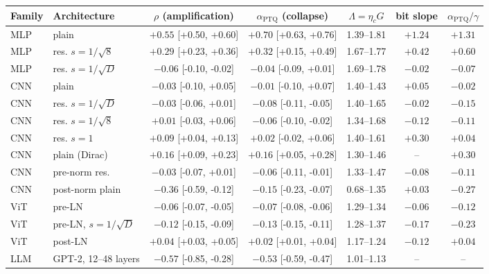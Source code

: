 \begin{tabular}{llccccc}
\toprule
Family & Architecture & $\rho$ (amplification) & $\alpha_{\mathrm{PTQ}}$ (collapse) & $\Lambda=\eta_c G$ & bit slope & $\alpha_{\mathrm{PTQ}}/\gamma$ \\
\midrule
MLP & plain & $+0.55$ {\scriptsize[+0.50, +0.60]} & $+0.70$ {\scriptsize[+0.63, +0.76]} & 1.39--1.81 & $+1.24$ & $+1.31$ \\
MLP & res. $s=1/\sqrt{8}$ & $+0.29$ {\scriptsize[+0.23, +0.36]} & $+0.32$ {\scriptsize[+0.15, +0.49]} & 1.67--1.77 & $+0.42$ & $+0.60$ \\
MLP & res. $s=1/\sqrt{D}$ & $-0.06$ {\scriptsize[-0.10, -0.02]} & $-0.04$ {\scriptsize[-0.09, +0.01]} & 1.69--1.78 & $-0.02$ & $-0.07$ \\
CNN & plain & $-0.03$ {\scriptsize[-0.10, +0.05]} & $-0.01$ {\scriptsize[-0.10, +0.07]} & 1.40--1.43 & $+0.05$ & $-0.02$ \\
CNN & res. $s=1/\sqrt{D}$ & $-0.03$ {\scriptsize[-0.06, +0.01]} & $-0.08$ {\scriptsize[-0.11, -0.05]} & 1.40--1.65 & $-0.02$ & $-0.15$ \\
CNN & res. $s=1/\sqrt{8}$ & $+0.01$ {\scriptsize[-0.03, +0.06]} & $-0.06$ {\scriptsize[-0.10, -0.02]} & 1.34--1.68 & $-0.12$ & $-0.11$ \\
CNN & res. $s=1$ & $+0.09$ {\scriptsize[+0.04, +0.13]} & $+0.02$ {\scriptsize[-0.02, +0.06]} & 1.40--1.61 & $+0.30$ & $+0.04$ \\
CNN & plain (Dirac) & $+0.16$ {\scriptsize[+0.09, +0.23]} & $+0.16$ {\scriptsize[+0.05, +0.28]} & 1.30--1.46 & -- & $+0.30$ \\
CNN & pre-norm res. & $-0.03$ {\scriptsize[-0.07, +0.01]} & $-0.06$ {\scriptsize[-0.11, -0.01]} & 1.33--1.47 & $-0.08$ & $-0.11$ \\
CNN & post-norm plain & $-0.36$ {\scriptsize[-0.59, -0.12]} & $-0.15$ {\scriptsize[-0.23, -0.07]} & 0.68--1.35 & $+0.03$ & $-0.27$ \\
ViT & pre-LN & $-0.06$ {\scriptsize[-0.07, -0.05]} & $-0.07$ {\scriptsize[-0.08, -0.06]} & 1.29--1.34 & $-0.06$ & $-0.12$ \\
ViT & pre-LN, $s=1/\sqrt{D}$ & $-0.12$ {\scriptsize[-0.15, -0.09]} & $-0.13$ {\scriptsize[-0.15, -0.11]} & 1.28--1.37 & $-0.17$ & $-0.23$ \\
ViT & post-LN & $+0.04$ {\scriptsize[+0.03, +0.05]} & $+0.02$ {\scriptsize[+0.01, +0.04]} & 1.17--1.24 & $-0.12$ & $+0.04$ \\
\midrule
LLM & GPT-2, 12--48 layers & $-0.57$ {\scriptsize[-0.85, -0.28]} & $-0.53$ {\scriptsize[-0.59, -0.47]} & 1.01--1.13 & -- & -- \\
\bottomrule
\end{tabular}
